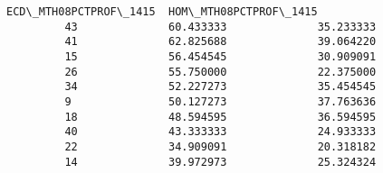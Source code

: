 \documentclass[11pt]{article}
\begin{document}
\begin{Verbatim}[commandchars=\\\{\}]
             ECD\_MTH08PCTPROF\_1415  HOM\_MTH08PCTPROF\_1415  
         43              60.433333              35.233333  
         41              62.825688              39.064220  
         15              56.454545              30.909091  
         26              55.750000              22.375000  
         34              52.227273              35.454545  
         9               50.127273              37.763636  
         18              48.594595              36.594595  
         40              43.333333              24.933333  
         22              34.909091              20.318182  
         14              39.972973              25.324324  
\end{Verbatim}
            

    
    
    
    
\end{document}
